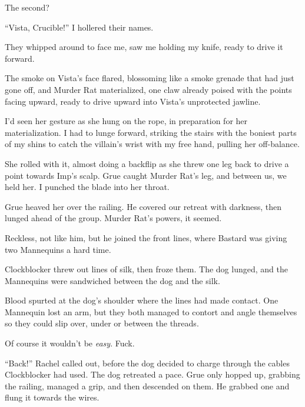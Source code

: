 The second?



``Vista, Crucible!'' I hollered their names.



They whipped around to face me, saw me holding my knife, ready to drive it forward.



The smoke on Vista's face flared, blossoming like a smoke grenade that had just gone off, and Murder Rat materialized, one claw already poised with the points facing upward, ready to drive upward into Vista's unprotected jawline.



I'd seen her gesture as she hung on the rope, in preparation for her materialization.  I had to lunge forward, striking the stairs with the boniest parts of my shins to catch the villain's wrist with my free hand, pulling her off-balance.



She rolled with it, almost doing a backflip as she threw one leg back to drive a point towards Imp's scalp.  Grue caught Murder Rat's leg, and between us, we held her.  I punched the blade into her throat.



Grue heaved her over the railing.  He covered our retreat with darkness, then lunged ahead of the group.  Murder Rat's powers, it seemed.



Reckless, not like him, but he joined the front lines, where Bastard was giving two Mannequins a hard time.



Clockblocker threw out lines of silk, then froze them.  The dog lunged, and the Mannequins were sandwiched between the dog and the silk.



Blood spurted at the dog's shoulder where the lines had made contact.  One Mannequin lost an arm, but they both managed to contort and angle themselves so they could slip over, under or between the threads.



Of course it wouldn't be \emph{easy}.  Fuck.



``Back!'' Rachel called out, before the dog decided to charge through the cables Clockblocker had used.  The dog retreated a pace.  Grue only hopped up, grabbing the railing, managed a grip, and then descended on them.  He grabbed one and flung it towards the wires.



